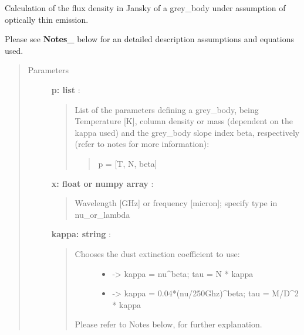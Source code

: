 \documentclass[a4paper,10pt,english]{sphinxmanual}
\begin{document}
\begin{fulllineitems}
\label{functions:astrolyze.functions.astro_functions.grey_body}
Calculation of the flux density in Jansky of a grey\_body under assumption
of optically thin emission.

Please see {\color{red}\bfseries{}Notes\_} below for an detailed description assumptions and
equations used.
\begin{quote}\begin{description}
\item[{Parameters }] \leavevmode
\textbf{p: list} :
\begin{quote}

List of the parameters defining a grey\_body, being Temperature {[}K{]},
column density or mass (dependent on the kappa used) and the grey\_body
slope index beta, respectively (refer to notes for more information):
\begin{quote}

p = {[}T, N, beta{]}
\end{quote}
\end{quote}

\textbf{x: float or numpy array} :
\begin{quote}

Wavelength {[}GHz{]} or frequency {[}micron{]};
specify type in nu\_or\_lambda
\end{quote}

\textbf{kappa: string} :
\begin{quote}
\begin{description}
\item[{Chooses the dust extinction coefficient to use:}] \leavevmode\begin{itemize}
\item {} 
 -\textgreater{} kappa = nu\textasciicircum{}beta; tau = N * kappa

\item {} 
 -\textgreater{} kappa = 0.04*(nu/250Ghz)\textasciicircum{}beta;
tau = M/D\textasciicircum{}2 * kappa

\end{itemize}

\end{description}

Please refer to Notes below, for further explanation.
\end{quote}


\end{description}
\end{quote}
\end{fulllineitems}
\end{document}
